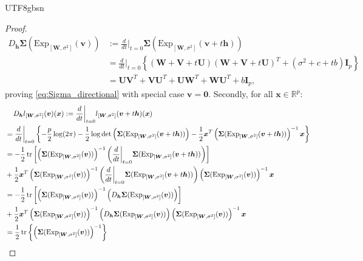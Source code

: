 \documentclass[12pt]{report}
\newcommand\tab[1][1cm]{\hspace*{#1}}
\newcommand{\bracket}[1]{\left ( #1 \right )}
\newcommand{\curly}[1]{\left \{ #1 \right \} }
\newcommand{\squared}[1]{\left [ #1 \right ]}
\theoremstyle{plain}
\theoremstyle{definition}
\begin{document}
\begin{CJK*}{UTF8}{gbsn}
\begin{proof}
\begin{equation}\label{eq:Sigma_derivative}
  \begin{split}
  D_{\bm{h}}\bm{\Sigma}(\text{Exp}_{[\bm{W},\sigma^2]}(\bm{v})) & :=
  \frac{d}{dt}\bigg|_{t=0} \bm{\Sigma}(\text{Exp}_{[\bm{W},\sigma^2]}(\bm{v} + t\bm{h}))
  \\ & = \frac{d}{dt}\bigg|_{t=0} \curly{(\bm{W}+\bm{V} + t\bm{U})(\bm{W}+\bm{V} + t\bm{U})^T + (\sigma^2+c+tb) \bm{I}_p}
  \\ & 
  = \bm{U}\bm{V}^T + \bm{V}\bm{U}^T + \bm{U}\bm{W}^T + \bm{W}\bm{U}^T + b  \bm{I}_p,
  \end{split}
\end{equation}
proving \eqref{eq:Sigma_directional} with special case $\bm{v}=\bm{0}$.
Secondly, for all $\bm{x} \in \mathbb{R}^p$:
\begin{equation}\label{eq:l_derivative}
  \begin{split}
  & \tab[0.4cm] D_{\bm{h}}l_{[\bm{W},\sigma^2]}(\bm{v})(\bm{x}) :=
  \frac{d}{dt}\bigg|_{t=0} l_{[\bm{W},\sigma^2]}(\bm{v} + t\bm{h})(\bm{x})
  \\ & = \frac{d}{dt}\bigg|_{t=0} \curly{-\frac{p}{2}\log(2\pi) 
  -\frac{1}{2}\log \det\bracket{\bm{\Sigma}(\text{Exp}_{[\bm{W},\sigma^2]}(\bm{v} + t\bm{h}))}
  - \frac{1}{2}\bm{x}^T\bracket{\bm{\Sigma}(\text{Exp}_{[\bm{W},\sigma^2]}(\bm{v} + t\bm{h}))}^{-1}\bm{x} }
  \\ & =
  -\frac{1}{2}\tr 
  \squared{\bracket{\bm{\Sigma}(\text{Exp}_{[\bm{W},\sigma^2]}(\bm{v}))}^{-1}
  \bracket{\frac{d}{dt}\bigg|_{t=0}\bm{\Sigma}(\text{Exp}_{[\bm{W},\sigma^2]}(\bm{v} + t\bm{h})) }}
  \\ & + \frac{1}{2}\bm{x}^T\bracket{\bm{\Sigma}(\text{Exp}_{[\bm{W},\sigma^2]}(\bm{v}))}^{-1}
  \bracket{\frac{d}{dt}\bigg|_{t=0}\bm{\Sigma}(\text{Exp}_{[\bm{W},\sigma^2]}(\bm{v} + t\bm{h}))}
  \bracket{\bm{\Sigma}(\text{Exp}_{[\bm{W},\sigma^2]}(\bm{v}))}^{-1}\bm{x}
  \\ & =
  -\frac{1}{2} \tr 
  \squared{\bracket{\bm{\Sigma}(\text{Exp}_{[\bm{W},\sigma^2]}(\bm{v}))}^{-1}
  \bracket{D_{\bm{h}}\bm{\Sigma}(\text{Exp}_{[\bm{W},\sigma^2]}(\bm{v})) }}
  \\ & + \frac{1}{2}\bm{x}^T\bracket{\bm{\Sigma}(\text{Exp}_{[\bm{W},\sigma^2]}(\bm{v}))}^{-1}
  \bracket{D_{\bm{h}}\bm{\Sigma}(\text{Exp}_{[\bm{W},\sigma^2]}(\bm{v}))}
  \bracket{\bm{\Sigma}(\text{Exp}_{[\bm{W},\sigma^2]}(\bm{v}))}^{-1}\bm{x}
  \\ & = \frac{1}{2} \tr \curly{\bracket{\bm{\Sigma}(\text{Exp}_{[\bm{W},\sigma^2]}(\bm{v}))}^{-1}
}
\end{split}
\end{equation}
\end{proof}
\end{CJK*}
\end{document}
